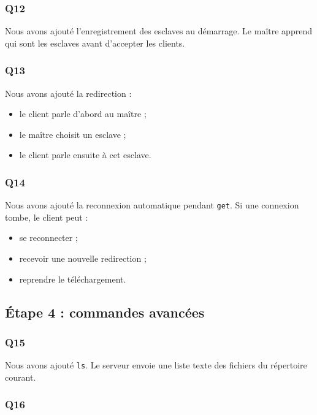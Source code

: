 \documentclass[a4paper,11pt]{article}
\begin{document}
\subsubsection{Q12}

Nous avons ajouté l'enregistrement des esclaves au démarrage. Le maître apprend
qui sont les esclaves avant d'accepter les clients.

\subsubsection{Q13}

Nous avons ajouté la redirection :

\begin{itemize}[leftmargin=*]
    \item le client parle d'abord au maître ;
    \item le maître choisit un esclave ;
    \item le client parle ensuite à cet esclave.
\end{itemize}

\subsubsection{Q14}

Nous avons ajouté la reconnexion automatique pendant \texttt{get}. Si une
connexion tombe, le client peut :

\begin{itemize}[leftmargin=*]
    \item se reconnecter ;
    \item recevoir une nouvelle redirection ;
    \item reprendre le téléchargement.
\end{itemize}

\subsection{Étape 4 : commandes avancées}

\subsubsection{Q15}

Nous avons ajouté \texttt{ls}. Le serveur envoie une liste texte des fichiers du
répertoire courant.

\subsubsection{Q16}
\end{document}
